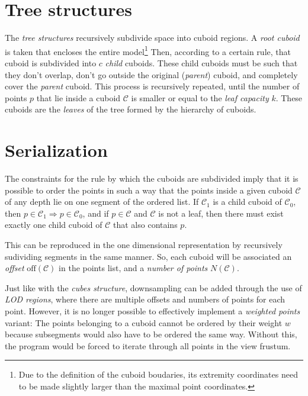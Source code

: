 \documentclass[a4paper,10pt,abstracton,notitlepage]{scrreprt}
\begin{document}
\section{Tree structures}
The \emph{tree structures} recursively subdivide space into cuboid regions. A \emph{root cuboid} is taken that encloses the entire model\footnote{Due to the definition of the cuboid boudaries, its extremity coordinates need to be made slightly larger than the maximal point coordinates.} Then, according to a certain rule, that cuboid is subdivided into $c$ \emph{child} cuboids. These child cuboids must be such that they don't overlap, don't go outside the original (\emph{parent}) cuboid, and completely cover the \emph{parent} cuboid. This process is recursively repeated, until the number of points $p$ that lie inside a cuboid $\mathcal{C}$ is smaller or equal to the \emph{leaf capacity} $k$. These cuboids are the \emph{leaves} of the tree formed by the hierarchy of cuboids.


\section{Serialization} \label{sec:tree_ser}
The constraints for the rule by which the cuboids are subdivided imply that it is possible to order the points in such a way that the points inside a given cuboid $\mathcal{C}$ of any depth lie on one segment of the ordered list. If $\mathcal{C}_{1}$ is a child cuboid of $\mathcal{C}_{0}$, then $p \in \mathcal{C}_{1} \Rightarrow p \in \mathcal{C}_{0}$, and if $p \in \mathcal{C}$ and $\mathcal{C}$ is not a leaf, then there must exist exactly one child cuboid of $\mathcal{C}$ that also contains $p$.

This can be reproduced in the one dimensional representation by recursively sudividing segments in the same manner. So, each cuboid will be associated an \emph{offset} $\text{off}(\mathcal{C})$ in the points list, and a \emph{number of points} $N(\mathcal{C})$.

Just like with the \emph{cubes structure}, downsampling can be added through the use of \emph{LOD regions}, where there are multiple offsets and numbers of points for each point. However, it is no longer possible to effectively implement a \emph{weighted points} variant: The points belonging to a cuboid cannot be ordered by their weight $w$ because subsegments would also have to be ordered the same way. Without this, the program would be forced to iterate through all points in the view frustum.
\end{document}
